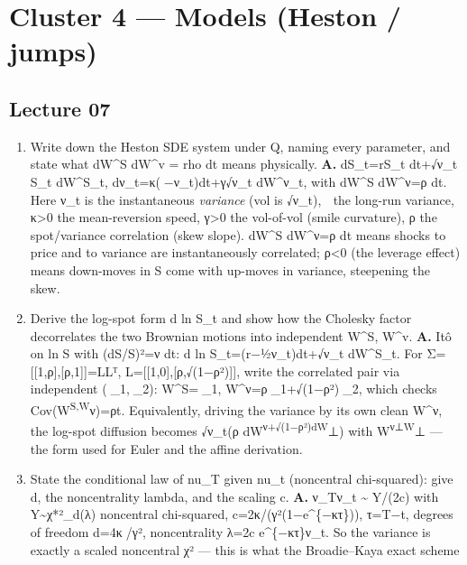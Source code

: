 \documentclass[
  11pt,
]{article}
\providecommand{\tightlist}{%
  \setlength{\itemsep}{0pt}\setlength{\parskip}{0pt}}
\begin{document}
\hypertarget{cluster-4-models-heston-jumps}{%
\section{Cluster 4 --- Models (Heston /
jumps)}\label{cluster-4-models-heston-jumps}}

\hypertarget{lecture-07}{%
\subsection{Lecture 07}\label{lecture-07}}

\begin{enumerate}
\def\labelenumi{\arabic{enumi}.}
\tightlist
\item
  Write down the Heston SDE system under Q, naming every parameter, and
  state what dW\^{}S dW\^{}v = rho dt means physically. \textbf{A.}
  dS\_t=rS\_t dt+√ν\_t S\_t dW\^{}S\_t, dν\_t=κ(−ν\_t)dt+γ√ν\_t
  dW\^{}ν\_t, with dW\^{}S dW\^{}ν=ρ dt. Here ν\_t is the instantaneous
  \emph{variance} (vol is √ν\_t),  the long-run variance,
  κ\textgreater0 the mean-reversion speed, γ\textgreater0 the vol-of-vol
  (smile curvature), ρ the spot/variance correlation (skew slope).
  dW\^{}S dW\^{}ν=ρ dt means shocks to price and to variance are
  instantaneously correlated; ρ\textless0 (the leverage effect) means
  down-moves in S come with up-moves in variance, steepening the skew.
\item
  Derive the log-spot form d ln S\_t and show how the Cholesky factor
  decorrelates the two Brownian motions into independent W\^{}S, W\^{}v.
  \textbf{A.} Itô on ln S with (dS/S)²=ν dt: d ln S\_t=(r−½ν\_t)dt+√ν\_t
  dW\^{}S\_t. For Σ={[}{[}1,ρ{]},{[}ρ,1{]}{]}=LLᵀ,
  L={[}{[}1,0{]},{[}ρ,√(1−ρ²){]}{]}, write the correlated pair via
  independent (\_1,\_2): W\^{}S=\_1, W\^{}ν=ρ\_1+√(1−ρ²)\_2, which
  checks Cov(W\textsuperscript{S,W}ν)=ρt. Equivalently, driving the
  variance by its own clean W\^{}ν, the log-spot diffusion becomes
  √ν\_t(ρ dW\textsuperscript{ν+√(1−ρ²)dW}⊥) with W\textsuperscript{ν⊥W}⊥
  --- the form used for Euler and the affine derivation.
\item
  State the conditional law of nu\_T given nu\_t (noncentral
  chi-squared): give d, the noncentrality lambda, and the scaling c.
  \textbf{A.} ν\_T\textbar ν\_t \textasciitilde{} Y/(2c) with
  Y\textasciitilde χ*²\_d(λ) noncentral chi-squared,
  c=2κ/(γ²(1−e\^{}\{−κτ\})), τ=T−t, degrees of freedom d=4κ/γ²,
  noncentrality λ=2c e\^{}\{−κτ\}ν\_t. So the variance is exactly a
  scaled noncentral χ² --- this is what the Broadie--Kaya exact scheme

\end{enumerate}
\end{document}

